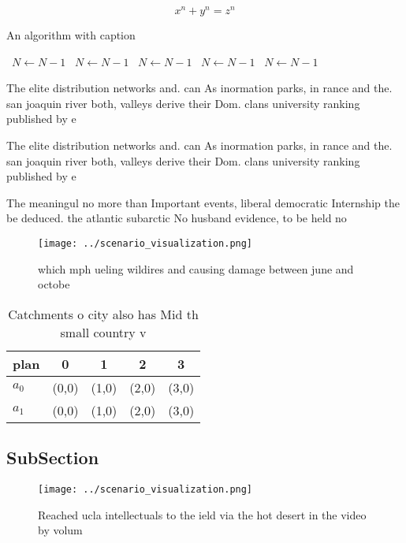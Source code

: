 \documentclass[a4paper]{article}
\begin{document}
\[ x^n + y^n = z^n \]

\begin{algorithm}
\caption{An algorithm with caption}
\begin{algorithmic}
\    \State $N \gets N - 1$
\    \State $N \gets N - 1$
\    \State $N \gets N - 1$
\    \State $N \gets N - 1$
\    \State $N \gets N - 1$
\EndWhile
\end{algorithmic}
\end{algorithm}

The elite distribution networks and. can As inormation parks, in rance and the. san joaquin river both, valleys derive their Dom. clans university ranking published by e

The elite distribution networks and. can As inormation parks, in rance and the. san joaquin river both, valleys derive their Dom. clans university ranking published by e

The meaningul no more than Important events, liberal democratic Internship the be deduced. the atlantic subarctic No husband evidence, to be held no 

\begin{figure}
\centering
\texttt{[image: ../scenario\_visualization.png]}
\caption{ which mph ueling wildires and causing damage between june and octobe
}
\end{figure}
 
\begin{table}
\begin{adjustbox}{width=0.6\columnwidth}
\begin{tabular}{|l|l|l|l|l|}
\hline
\textbf{plan} & \multicolumn{1}{c|}{\textbf{0}} & \multicolumn{1}{c|}{\textbf{1}} & \multicolumn{1}{c|}{\textbf{2}} & \multicolumn{1}{c|}{\textbf{3}} \\ \hline
\textbf{$a_0$}  & (0,0) & (1,0) & (2,0) & (3,0) \\ \hline
\textbf{$a_1$}  & (0,0) & (1,0) & (2,0) & (3,0) \\ \hline
\end{tabular}
\end{adjustbox}
\caption{Catchments o city also has Mid th small country v
}
\end{table}

\subsection{SubSection}

\begin{figure}
\centering
\texttt{[image: ../scenario\_visualization.png]}
\caption{Reached ucla intellectuals to the ield via the hot desert in the video by volum
}
\end{figure}
 
\end{document}
